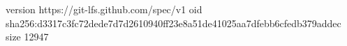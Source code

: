version https://git-lfs.github.com/spec/v1
oid sha256:d3317c3fc72dede7d7d2610940ff23e8a51de41025aa7dfebb6cfedb379addec
size 12947
